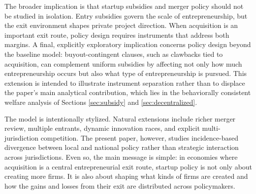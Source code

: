 The broader implication is that startup subsidies and merger policy should not be studied in isolation. Entry subsidies govern the scale of entrepreneurship, but the exit environment shapes private project direction. When acquisition is an important exit route, policy design requires instruments that address both margins. A final, explicitly exploratory implication concerns policy design beyond the baseline model: buyout-contingent clauses, such as clawbacks tied to acquisition, can complement uniform subsidies by affecting not only how much entrepreneurship occurs but also what type of entrepreneurship is pursued. This extension is intended to illustrate instrument separation rather than to displace the paper's main analytical contribution, which lies in the behaviorally consistent welfare analysis of Sections \ref{sec:subsidy} and \ref{sec:decentralized}.

The model is intentionally stylized. Natural extensions include richer merger review, multiple entrants, dynamic innovation races, and explicit multi-jurisdiction competition. The present paper, however, studies incidence-based divergence between local and national policy rather than strategic interaction across jurisdictions. Even so, the main message is simple: in economies where acquisition is a central entrepreneurial exit route, startup policy is not only about creating more firms. It is also about shaping what kinds of firms are created and how the gains and losses from their exit are distributed across policymakers.
